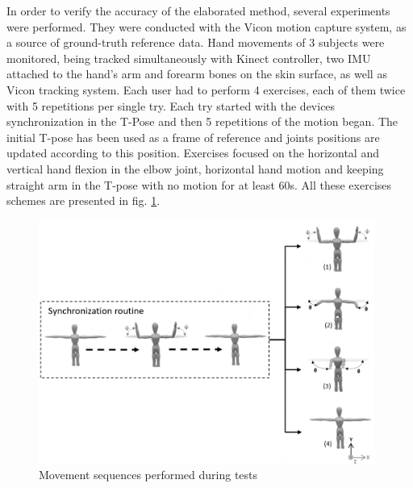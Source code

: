 \documentclass[sensors,article,submit,moreauthors,pdftex,10pt,a4paper]{mdpi}
\begin{document}
		
In order to verify the accuracy of the elaborated method, several experiments were performed. They were conducted with the Vicon motion capture system, as a source of ground-truth reference data. Hand movements of 3 subjects were monitored, being tracked simultaneously with Kinect controller, two IMU attached to the hand's arm and forearm bones on the skin surface, as well as Vicon tracking system. Each user had to perform 4 exercises, each of them twice with 5 repetitions per single try. Each try started with the devices synchronization in the T-Pose and then 5 repetitions of the motion began. The initial T-pose has been used as a frame of reference and joints positions are updated according to this position. Exercises focused on the horizontal and vertical hand flexion in the elbow joint, horizontal hand motion and keeping straight arm in the T-pose with no motion for at least 60s. All these exercises schemes are presented in fig. \ref{fig:results:sequences}.
		
\begin{figure}[H] %
	\centering
	\includegraphics[width=11cm]{Figure11.png}
	\caption{Movement sequences performed during tests}
	\label{fig:results:sequences}
\end{figure}
\end{document}
